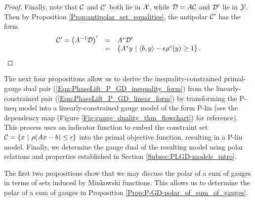 \begin{proof}
Finally, note that ${\mathcal C}$ and ${\mathcal C}'$ both lie in ${\mathcal X}$, while ${\mathcal D} = A{\mathcal C}$ and ${\mathcal D}'$ lie in ${\mathcal Y}$.  Then by Proposition \ref{Prop:antipolar_set_equalities}, the antipolar ${\mathcal C}'$ has the form
\begin{equation}
\begin{array}{lll}
\caC' = \left(A^{-1} \caD \right)'	& =  &	A^* \caD' 	\\
	&	=	&		\left\{ A^*y 	\	|	\ \langle b, y \rangle - \epsilon \rho^\circ(y) \geq 1  \right\}.
\end{array}
\end{equation}
\end{proof}





The next four propositions allow us to derive the inequality-constrained primal-gauge dual pair (\ref{Eqn:PhaseLift_P_GD_inequality_form}) from the linearly-constrained pair (\ref{Eqn:PhaseLift_P_GD_linear_form}) by transforming the P-ineq model into a linearly-constrained gauge model of the form P-lin (see the dependency map (Figure \ref{Fig:gauge_duality_thm_flowchart}) for reference).   This process uses an indicator function to embed the constraint set ${\mathcal C} = \{ x \ | \ \rho(Ax-b) \leq \epsilon\}$ into the primal objective function, resulting in a P-lin model.  Finally, we determine the gauge dual of the resulting model using polar relations and properties established in Section \ref{Subsec:PLGD-models_intro}.


The first two propositions show that we may discuss the polar of a sum of gauges in terms of sets induced by Minkowski functions.  This allows us to determine the polar of a sum of gauges in Proposition \ref{Prop:P-GD-polar_of_sum_of_gauges}.


